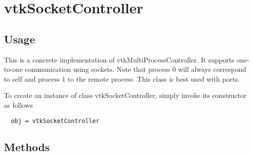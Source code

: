 \section{vtkSocketController}

\subsection{Usage}

 This is a concrete implementation of vtkMultiProcessController.
 It supports one-to-one communication using sockets. Note that
 process 0 will always correspond to self and process 1 to the
 remote process. This class is best used with ports.

To create an instance of class vtkSocketController, simply
invoke its constructor as follows
\begin{verbatim}
  obj = vtkSocketController
\end{verbatim}
\subsection{Methods}


